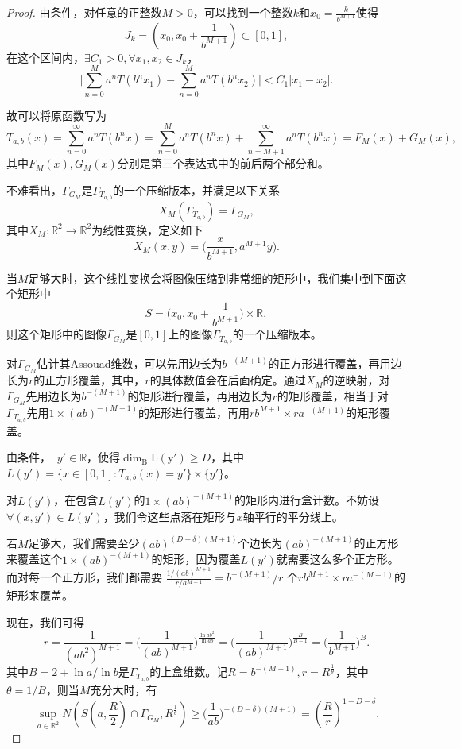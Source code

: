 \begin{proof}
      由条件，对任意的正整数$M>0$，可以找到一个整数$k$和$x_0=\frac{k}{b^{M+1}}$使得
      $$J_k=(x_0,x_0+\frac{1}{b^{M+1}})\subset[0,1],$$
      在这个区间内，$\exists C_1>0,\forall x_1,x_2\in J_k$，
            $$
                  \bigg|\sum_{n=0}^{M}a^nT(b^nx_1)-\sum_{n=0}^{M}a^nT(b^nx_2)\bigg|<C_1|x_1-x_2|.
            $$

            故可以将原函数写为
            $$
                  T_{a,b}(x)=\sum_{n=0}^{\infty}a^nT(b^nx)=\sum_{n=0}^{M}a^nT(b^nx)+\sum_{n=M+1}^{\infty}a^nT(b^nx)=F_M(x)+G_M(x),
            $$
            其中$F_M(x),G_M(x)$分别是第三个表达式中的前后两个部分和。

            不难看出，$\Gamma_{G_M}$是$\Gamma_{T_{a,b}}$的一个压缩版本，并满足以下关系
            $$
                  X_M(\Gamma_{T_{a,b}})=\Gamma_{G_M},
            $$
            其中$X_M:\mathbb{R}^2\rightarrow\mathbb{R}^2$为线性变换，定义如下
            $$
                  X_M(x,y)=\big(\frac{x}{b^{M+1}},a^{M+1}y\big).
            $$

            当$M$足够大时，这个线性变换会将图像压缩到非常细的矩形中，我们集中到下面这个矩形中
            $$
                  S=\big(x_0,x_0+\frac{1}{b^{M+1}}\big)\times\mathbb{R},
            $$
            则这个矩形中的图像$\Gamma_{G_M}$是$[0,1]$上的图像$\Gamma_{T_{a,b}}$的一个压缩版本。

            对$\Gamma_{G_M}$估计其Assouad维数，可以先用边长为$b^{-(M+1)}$的正方形进行覆盖，再用边长为$r$的正方形覆盖，其中，$r$的具体数值会在后面确定。通过$X_M$的逆映射，对$\Gamma_{G_M}$先用边长为$b^{-(M+1)}$的矩形进行覆盖，再用边长为$r$的矩形覆盖，相当于对$\Gamma_{T_{a,b}}$先用$1\times(ab)^{-(M+1)}$的矩形进行覆盖，再用$rb^{M+1}\times ra^{-(M+1)}$的矩形覆盖。

            由条件，$\exists y'\in\mathbb{R}$，使得$\mathrm{\dim_BL(y')}\ge D$，其中$L(y')=\{x\in[0,1]:T_{a,b}(x)=y'\}\times\{y'\}$。

            对$L(y')$，在包含$L(y')$的$1\times(ab)^{-(M+1)}$的矩形内进行盒计数。不妨设$\forall (x,y')\in L(y')$，我们令这些点落在矩形与$x$轴平行的平分线上。

            若$M$足够大，我们需要至少$(ab)^{(D-\delta)(M+1)}$个边长为$(ab)^{-(M+1)}$的正方形来覆盖这个$1\times (ab)^{-(M+1)}$的矩形，因为覆盖$L(y')$就需要这么多个正方形。而对每一个正方形，我们都需要
            $\frac{1/(ab)^{M+1}}{r/a^{M+1}}=b^{-(M+1)}/r$
            个$rb^{M+1}\times ra^{-(M+1)}$的矩形来覆盖。

            现在，我们可得
            $$
                  r = \frac{1}{(ab^2)^{M+1}}=\big(\frac{1}{(ab)^{M+1}}\big)^{\frac{\ln ab^2}{\ln ab}}=\big(\frac{1}{(ab)^{M+1}}\big)^{\frac{B}{B-1}}=\big(\frac{1}{b^{M+1}}\big)^B.
            $$
            其中$B=2+\ln a/\ln b$是$\Gamma_{T_{a,b}}$的上盒维数。记$R=b^{-(M+1)},r=R^{\frac{1}{\theta}}$，其中$\theta=1/B$，则当$M$充分大时，有
            $$
                  \sup\limits_{a\in\mathbb{R}^2}N(S(a,\frac{R}{2})\cap\Gamma_{G_M},R^{\frac{1}{\theta}})\ge\big(\frac{1}{ab}\big)^{-(D-\delta)(M+1)}=(\frac{R}{r})^{1+D-\delta}.
            $$


\end{proof}
